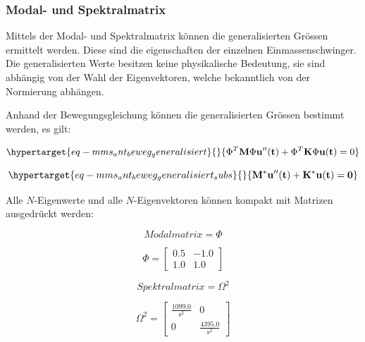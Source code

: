 \documentclass[
  letterpaper,
  DIV=11]{scrreprt}
\begin{document}
\hypertarget{modal--und-spektralmatrix-2}{%
\subsubsection{Modal- und
Spektralmatrix}\label{modal--und-spektralmatrix-2}}

Mittels der Modal- und Spektralmatrix können die generalisierten Grössen
ermittelt werden. Diese sind die eigenschaften der einzelnen
Einmassenschwinger. Die generalisierten Werte besitzen keine
physikalische Bedeutung, sie sind abhängig von der Wahl der
Eigenvektoren, welche bekanntlich von der Normierung abhängen.

Anhand der Bewegungsgleichung können die generalisierten Grössen
bestimmt werden, es gilt:

\begin{equation}\protect\hypertarget{eq-mms_ant_beweg_generalisiert}{}{
\Phi^T\mathbf{ M} \Phi \mathbf{u''(t)} + \Phi^T \mathbf{K} \Phi \mathbf{u(t)} = 0
}\label{eq-mms_ant_beweg_generalisiert}\end{equation}

\begin{equation}\protect\hypertarget{eq-mms_ant_beweg_generalisiert_subs}{}{
\mathbf{M^*u''(t) + K^* u(t) = 0}
}\label{eq-mms_ant_beweg_generalisiert_subs}\end{equation}

Alle \(N\)-Eigenwerte und alle \(N\)-Eigenvektoren können kompakt mit
Matrizen ausgedrückt werden:

\begin{equation}Modalmatrix = \Phi\end{equation}

\begin{equation}\Phi = \left[\begin{matrix}0.5 & -1.0\\1.0 & 1.0\end{matrix}\right]\end{equation}

\begin{equation}Spektralmatrix = \Omega^{2}\end{equation}

\begin{equation}\Omega^{2} = \left[\begin{matrix}\frac{1099.0}{\text{s}^{2}} & 0\\0 & \frac{4395.0}{\text{s}^{2}}\end{matrix}\right]\end{equation}
\end{document}
